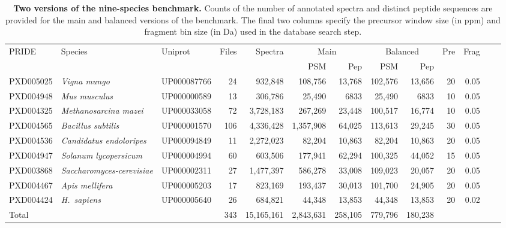 \documentclass{article}
\begin{document}

\begin{table}
  \centering
  \scriptsize
\begin{tabular}{lllrrrrrrrrrr}
\hline
PRIDE & Species & Uniprot & Files & Spectra &
\multicolumn{2}{c}{Main} & \multicolumn{2}{c}{Balanced} & Pre & Frag \\
& & & & & PSM & Pep  & PSM & Pep  \\
\hline
PXD005025 & \textit{Vigna mungo} & UP000087766 & 24 & 932,848 &
108,756 & 13,768 & 102,576 & 13,656 & 20 & 0.05 \\
PXD004948 & \textit{Mus musculus} & UP000000589 & 13 & 306,786 & 
25,490 & 6833 & 25,490 & 6833 & 10 & 0.05 \\
PXD004325 & \textit{Methanosarcina mazei} & UP000033058  & 72 & 3,728,183 &
267,269 & 23,448 & 100,517 & 16,774 & 10 & 0.05 \\
 PXD004565 & \textit{Bacillus subtilis} & UP000001570 & 106 & 4,336,428 &
1,357,908 & 64,025 & 113,613 & 29,245 & 30 & 0.05 \\
PXD004536 & \textit{Candidatus endoloripes} & UP000094849 & 11 & 2,272,023 &
82,204 & 10,863 & 82,204 & 10,863 & 20 & 0.05 \\
PXD004947 & \textit{Solanum lycopersicum} & UP000004994 & 60 & 603,506 &
177,941 & 62,294 & 100,325 & 44,052 & 15 & 0.05 \\
PXD003868 & \textit{Saccharomyces-cerevisiae} & UP000002311 & 27 & 1,477,397 &
586,278 & 33,008 & 109,023 & 20,057 & 20 & 0.05 \\
PXD004467 & \textit{Apis mellifera} & UP000005203 & 17 & 823,169 &
193,437 & 30,013 & 101,700 & 24,905 & 20 & 0.05 \\
PXD004424 & \textit{H.\ sapiens} & UP000005640 & 26 & 684,821 &
44,348 & 13,853 & 44,348 & 13,853 & 20 & 0.02 \\
\hline
Total & & & 343 & 15,165,161  & 2,843,631 & 258,105 & 779,796 & 180,238  \\
\end{tabular}
\caption{{\bf Two versions of the nine-species benchmark.}
  Counts of the number of annotated spectra and distinct peptide sequences are provided for the main and balanced versions of the benchmark.
The final two columns specify the precursor window size (in ppm) and fragment bin size (in Da) used in the database search step.
}
\label{tab:benchmark}
\end{table}
\end{document}
